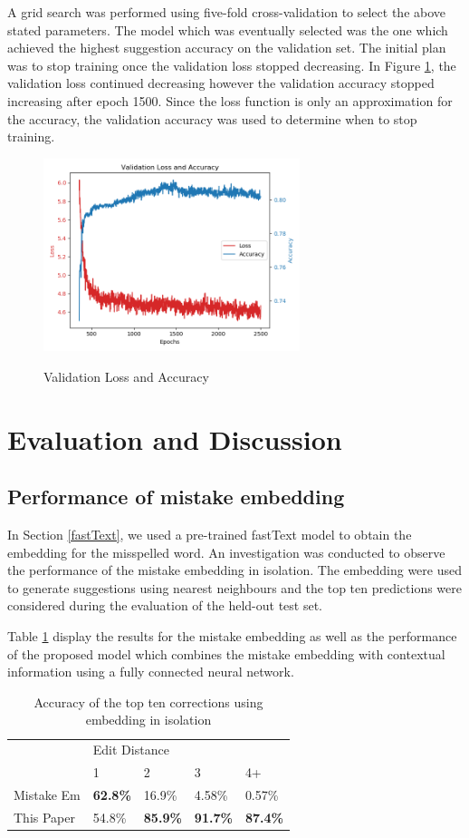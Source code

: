 \documentclass[11pt,a4paper]{article}
\begin{document}
A grid search was performed using five-fold cross-validation to select the above stated parameters. The model which was eventually selected was the one which achieved the highest suggestion accuracy on the validation set. The initial plan was to stop training once the validation loss stopped decreasing. In Figure \ref{img:losses}, the validation loss continued decreasing however the validation accuracy stopped increasing after epoch 1500. Since the loss function is only an approximation for the accuracy, the validation accuracy was used to determine when to stop training.

\begin{figure}[H]
\caption{Validation Loss and Accuracy}
\centering
\includegraphics[width=7.5cm]{Epochs.png}
\label{img:losses}
\end{figure}

\section{Evaluation and Discussion}
\subsection{Performance of mistake embedding} \label{individualemb}
In Section \ref{fastText}, we used a pre-trained fastText model to obtain the embedding for the misspelled word. An investigation was conducted to observe the performance of the mistake embedding in isolation. The embedding were used to generate suggestions using nearest neighbours and the top ten predictions were considered during the evaluation of the held-out test set. 

Table \ref{Tab:purecompare} display the results for the mistake embedding as well as the performance of the proposed model which combines the mistake embedding with contextual information using a fully connected neural network. 

\begin{table}[H]		
\caption{Accuracy of the top ten corrections using embedding in isolation}
\begin{tabular}{l|llll}
           & \multicolumn{4}{l}{Edit Distance} \\ \cline{2-5} 
           & 1      & 2      & 3      & 4+     \\ \hline
Mistake Em & \textbf{62.8\%} & 16.9\% & 4.58\% & 0.57\%    \\
This Paper & 54.8\% & \textbf{85.9\%} & \textbf{91.7\%} & \textbf{87.4\%}  
\end{tabular}
\label{Tab:purecompare}   
\end{table}
\end{document}
